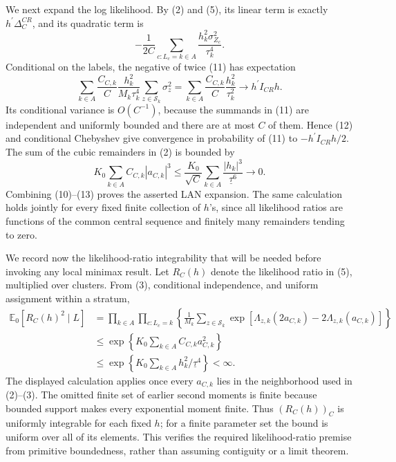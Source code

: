 We next expand the log likelihood.  By (2) and (5), its linear term is exactly \(h^{\prime}\Delta_C^{CR}\), and its quadratic term is
\[
 -\frac1{2C}\sum_{c:L_c=k\in A}
       \frac{h_k^2\sigma_{Z_c}^2}{\tau_k^4}.                    \tag{11}
\]
Conditional on the labels, the negative of twice (11) has expectation
\[
 \sum_{k\in A}\frac{C_{C,k}}C
       \frac{h_k^2}{M_k\tau_k^4}
       \sum_{z\in\mathcal S_k}\sigma_z^2
 =\sum_{k\in A}\frac{C_{C,k}}C\frac{h_k^2}{\tau_k^2}
 \longrightarrow h^{\prime}I_{CR}h.                            \tag{12}
\]
Its conditional variance is \(O(C^{-1})\), because the summands in (11) are independent and uniformly bounded and there are at most \(C\) of them.  Hence (12) and conditional Chebyshev give convergence in probability of (11) to \(-h^{\prime}I_{CR}h/2\).  The sum of the cubic remainders in (2) is bounded by
\[
 K_0\sum_{k\in A}C_{C,k}|a_{C,k}|^3
 \leq \frac{K_0}{\sqrt C}
       \sum_{k\in A}\frac{|h_k|^3}{\underline\tau^6}
 \longrightarrow0.                                              \tag{13}
\]
Combining (10)--(13) proves the asserted LAN expansion.  The same calculation holds jointly for every fixed finite collection of \(h\)'s, since all likelihood ratios are functions of the common central sequence and finitely many remainders tending to zero.

We record now the likelihood-ratio integrability that will be needed before invoking any local minimax result.  Let \(R_C(h)\) denote the likelihood ratio in (5), multiplied over clusters.  From (3), conditional independence, and uniform assignment within a stratum,
\[
 \begin{aligned}
 \mathbb E_0[R_C(h)^2\mid L]
 &=\prod_{k\in A}\prod_{c:L_c=k}
   \left\{\frac1{M_k}\sum_{z\in\mathcal S_k}
   \exp[\Lambda_{z,k}(2a_{C,k})-2\Lambda_{z,k}(a_{C,k})]\right\}\\
 &\leq
 \exp\!\left\{K_0\sum_{k\in A}C_{C,k}a_{C,k}^2\right\}\\
 &\leq
 \exp\!\left\{K_0\sum_{k\in A}h_k^2/\underline\tau^4\right\}<\infty .
 \end{aligned}                                                   \tag{14}
\]
The displayed calculation applies once every \(a_{C,k}\) lies in the neighborhood used in (2)--(3).  The omitted finite set of earlier second moments is finite because bounded support makes every exponential moment finite.  Thus \((R_C(h))_C\) is uniformly integrable for each fixed \(h\); for a finite parameter set the bound is uniform over all of its elements.  This verifies the required likelihood-ratio premise from primitive boundedness, rather than assuming contiguity or a limit theorem.

